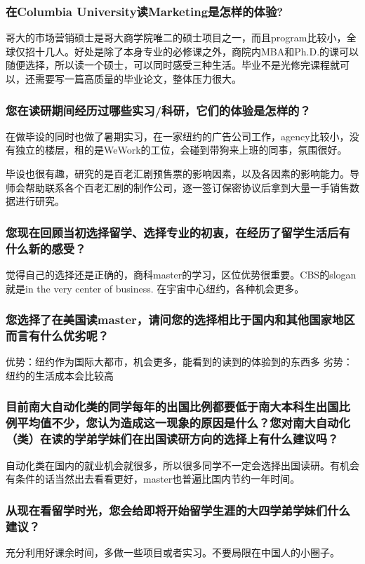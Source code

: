 \documentclass[a4paper,UTF8]{book}
\begin{document}
    \subsubsection*{在Columbia University读Marketing是怎样的体验?}
    哥大的市场营销硕士是哥大商学院唯二的硕士项目之一，而且program比较小，全球仅招十几人。好处是除了本身专业的必修课之外，商院内MBA和Ph.D.的课可以随便选择，所以读一个硕士，可以同时感受三种生活。毕业不是光修完课程就可以，还需要写一篇高质量的毕业论文，整体压力很大。
    \subsubsection*{您在读研期间经历过哪些实习/科研，它们的体验是怎样的？}
    在做毕设的同时也做了暑期实习，在一家纽约的广告公司工作，agency比较小，没有独立的楼层，租的是WeWork的工位，会碰到带狗来上班的同事，氛围很好。

    毕设也很有趣，研究的是百老汇剧预售票的影响因素，以及各因素的影响能力。导师会帮助联系各个百老汇剧的制作公司，逐一签订保密协议后拿到大量一手销售数据进行研究。
    \subsubsection*{您现在回顾当初选择留学、选择专业的初衷，在经历了留学生活后有什么新的感受？}
    觉得自己的选择还是正确的，商科master的学习，区位优势很重要。CBS的slogan就是in the very center of business.  在宇宙中心纽约，各种机会更多。 
    \subsubsection*{您选择了在美国读master，请问您的选择相比于国内和其他国家地区而言有什么优劣呢？}
    优势：纽约作为国际大都市，机会更多，能看到的读到的体验到的东西多
    劣势：纽约的生活成本会比较高
    \subsubsection*{目前南大自动化类的同学每年的出国比例都要低于南大本科生出国比例平均值不少，您认为造成这一现象的原因是什么？您对南大自动化（类）在读的学弟学妹们在出国读研方向的选择上有什么建议吗？}
    自动化类在国内的就业机会就很多，所以很多同学不一定会选择出国读研。有机会有条件的话当然出去看看更好，master也普遍比国内节约一年时间。
    \subsubsection*{从现在看留学时光，您会给即将开始留学生涯的大四学弟学妹们什么建议？}
    充分利用好课余时间，多做一些项目或者实习。不要局限在中国人的小圈子。
\end{document}
